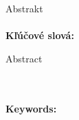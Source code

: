 \documentclass[12pt, oneside]{book}
\begin{document}

\newpage 
\thispagestyle{empty}

\huge{Abstrakt}
\normalsize
\newline
{}
\\
\\
{\bf Kľúčové slová:} 


\newpage 
\thispagestyle{empty}

\huge{Abstract}
\normalsize
\newline

\\
\\
{\bf Keywords:} 


%
%



\newpage 
\tableofcontents
\end{document}
